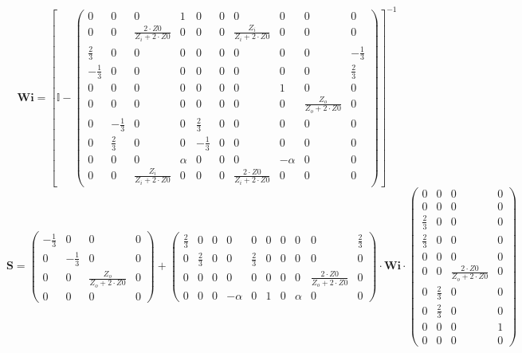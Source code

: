 \[ \mathbf{Wi} =  \left[ \mathbb{I}  - \left(\begin{smallmatrix} 0 & 0 & 0 & 1 & 0 & 0 & 0 & 0 & 0 & 0 \\ 0 & 0 & \frac{2\cdot Z0}{Z_i+2\cdot Z0} & 0 & 0 & 0 & \frac{Z_i}{Z_i+2\cdot Z0} & 0 & 0 & 0 \\ \frac{2}{3} & 0 & 0 & 0 & 0 & 0 & 0 & 0 & 0 & -\frac{1}{3} \\ -\frac{1}{3} & 0 & 0 & 0 & 0 & 0 & 0 & 0 & 0 & \frac{2}{3} \\ 0 & 0 & 0 & 0 & 0 & 0 & 0 & 1 & 0 & 0 \\ 0 & 0 & 0 & 0 & 0 & 0 & 0 & 0 & \frac{Z_o}{Z_o+2\cdot Z0} & 0 \\ 0 & -\frac{1}{3} & 0 & 0 & \frac{2}{3} & 0 & 0 & 0 & 0 & 0 \\ 0 & \frac{2}{3} & 0 & 0 & -\frac{1}{3} & 0 & 0 & 0 & 0 & 0 \\ 0 & 0 & 0 & \alpha & 0 & 0 & 0 & -\alpha & 0 & 0 \\ 0 & 0 & \frac{Z_i}{Z_i+2\cdot Z0} & 0 & 0 & 0 & \frac{2\cdot Z0}{Z_i+2\cdot Z0} & 0 & 0 & 0 \end{smallmatrix}\right) \right]^{-1}  \]
\[ \mathbf{S} = \left(\begin{smallmatrix} -\frac{1}{3} & 0 & 0 & 0 \\ 0 & -\frac{1}{3} & 0 & 0 \\ 0 & 0 & \frac{Z_o}{Z_o+2\cdot Z0} & 0 \\ 0 & 0 & 0 & 0 \end{smallmatrix}\right) + \left(\begin{smallmatrix} \frac{2}{3} & 0 & 0 & 0 & 0 & 0 & 0 & 0 & 0 & \frac{2}{3} \\ 0 & \frac{2}{3} & 0 & 0 & \frac{2}{3} & 0 & 0 & 0 & 0 & 0 \\ 0 & 0 & 0 & 0 & 0 & 0 & 0 & 0 & \frac{2\cdot Z0}{Z_o+2\cdot Z0} & 0 \\ 0 & 0 & 0 & -\alpha & 0 & 1 & 0 & \alpha & 0 & 0 \end{smallmatrix}\right) \cdot \mathbf{Wi} \cdot\left(\begin{smallmatrix} 0 & 0 & 0 & 0 \\ 0 & 0 & 0 & 0 \\ \frac{2}{3} & 0 & 0 & 0 \\ \frac{2}{3} & 0 & 0 & 0 \\ 0 & 0 & 0 & 0 \\ 0 & 0 & \frac{2\cdot Z0}{Z_o+2\cdot Z0} & 0 \\ 0 & \frac{2}{3} & 0 & 0 \\ 0 & \frac{2}{3} & 0 & 0 \\ 0 & 0 & 0 & 1 \\ 0 & 0 & 0 & 0 \end{smallmatrix}\right) \]
